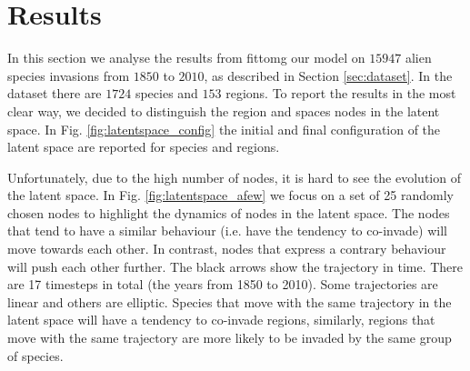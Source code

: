 \documentclass[mscthesis]{usiinfthesis}
\begin{document}
%

\chapter{Results}

In this section we analyse the results from fittomg our model on $15947$ alien species invasions from $1850$ to $2010$, as described in Section \ref{sec:dataset}. In the dataset there are $1724$ species and $153$ regions. To report the results in the most clear way, we decided to distinguish the region and spaces nodes in the latent space. In Fig. \ref{fig:latentspace_config} the initial and final configuration of the latent space are reported for species and regions. 

Unfortunately, due to the high number of nodes, it is hard to see the evolution of the latent space. In Fig. \ref{fig:latentspace_afew} we focus on a set of 25 randomly chosen nodes to highlight the dynamics of nodes in the latent space. The nodes that tend to have a similar behaviour (i.e. have the tendency to co-invade) will move towards each other. In contrast, nodes that express a contrary behaviour will push each other further. The black arrows show the trajectory in time. There are 17 timesteps in total (the years from 1850 to 2010). Some trajectories are linear and others are elliptic. Species that move with the same trajectory in the latent space will have a tendency to co-invade regions, similarly, regions that move with the same trajectory are more likely to be invaded by the same group of species.
\end{document}
